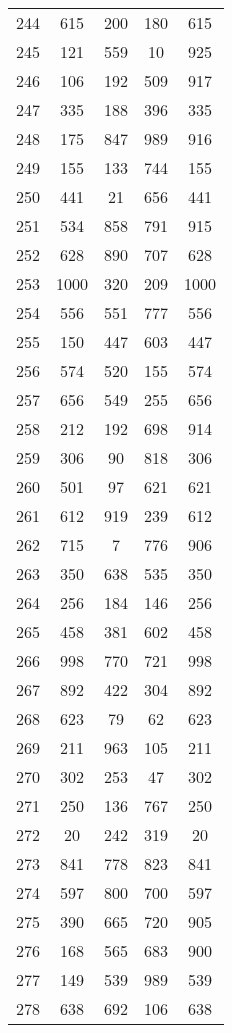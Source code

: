 \documentclass[a4paper,10pt,ngerman]{scrartcl}
\begin{document}
\begin{longtable}[c]{c|c|c|c|c}
    244 & 615 & 200 & 180 & 615 \\
    245 & 121 & 559 & 10 & 925 \\
    246 & 106 & 192 & 509 & 917 \\
    247 & 335 & 188 & 396 & 335 \\
    248 & 175 & 847 & 989 & 916 \\
    249 & 155 & 133 & 744 & 155 \\
    250 & 441 & 21 & 656 & 441 \\
    251 & 534 & 858 & 791 & 915 \\
    252 & 628 & 890 & 707 & 628 \\
    253 & 1000 & 320 & 209 & 1000 \\
    254 & 556 & 551 & 777 & 556 \\
    255 & 150 & 447 & 603 & 447 \\
    256 & 574 & 520 & 155 & 574 \\
    257 & 656 & 549 & 255 & 656 \\
    258 & 212 & 192 & 698 & 914 \\
    259 & 306 & 90 & 818 & 306 \\
    260 & 501 & 97 & 621 & 621 \\
    261 & 612 & 919 & 239 & 612 \\
    262 & 715 & 7 & 776 & 906 \\
    263 & 350 & 638 & 535 & 350 \\
    264 & 256 & 184 & 146 & 256 \\
    265 & 458 & 381 & 602 & 458 \\
    266 & 998 & 770 & 721 & 998 \\
    267 & 892 & 422 & 304 & 892 \\
    268 & 623 & 79 & 62 & 623 \\
    269 & 211 & 963 & 105 & 211 \\
    270 & 302 & 253 & 47 & 302 \\
    271 & 250 & 136 & 767 & 250 \\
    272 & 20 & 242 & 319 & 20 \\
    273 & 841 & 778 & 823 & 841 \\
    274 & 597 & 800 & 700 & 597 \\
    275 & 390 & 665 & 720 & 905 \\
    276 & 168 & 565 & 683 & 900 \\
    277 & 149 & 539 & 989 & 539 \\
    278 & 638 & 692 & 106 & 638 \\

\end{longtable}
\end{document}
